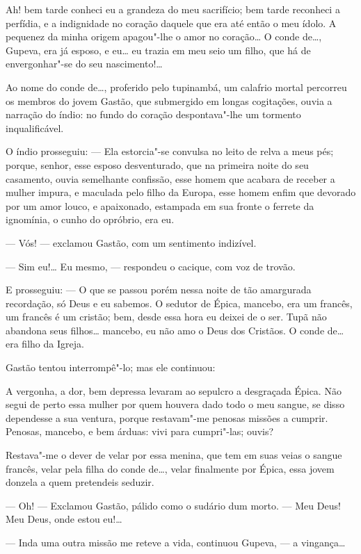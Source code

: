 Ah! bem tarde conheci eu a grandeza do meu sacrifício; bem tarde
reconheci a perfídia, e a indignidade no coração daquele que era até
então o meu ídolo. A pequenez da minha origem apagou"-lhe o amor no
coração\ldots{} O conde de\ldots{}, Gupeva, era já esposo, e eu\ldots{} eu trazia em
meu seio um filho, que há de envergonhar"-se do seu nascimento!\ldots{}

Ao nome do conde de\ldots{}, proferido pelo tupinambá, um calafrio mortal
percorreu os membros do jovem Gastão, que submergido em longas
cogitações, ouvia a narração do índio: no fundo do coração
despontava"-lhe um tormento inqualificável.

O índio prosseguiu: --- Ela estorcia"-se convulsa no leito de relva a
meus pés; porque, senhor, esse esposo desventurado, que na primeira
noite do seu casamento, ouvia semelhante confissão, esse homem que
acabara de receber a mulher impura, e maculada pelo filho da Europa,
esse homem enfim que devorado por um amor louco, e apaixonado, estampada
em sua fronte o ferrete da ignomínia, o cunho do opróbrio, era eu.

--- Vós! --- exclamou Gastão, com um sentimento indizível.

--- Sim eu!\ldots{} Eu mesmo, --- respondeu o cacique, com voz de trovão.

E prosseguiu: --- O que se passou porém nessa noite de tão amargurada
recordação, só Deus e eu sabemos. O sedutor de Épica, mancebo, era um
francês, um francês é um cristão; bem, desde essa hora eu deixei de o
ser. Tupã não abandona seus filhos\ldots{} mancebo, eu não amo o Deus dos
Cristãos. O conde de\ldots{} era filho da Igreja.

Gastão tentou interrompê"-lo; mas ele continuou:

A vergonha, a dor, bem depressa levaram ao sepulcro a desgraçada Épica.
Não segui de perto essa mulher por quem houvera dado todo o meu sangue,
se disso dependesse a sua ventura, porque restavam"-me penosas missões a
cumprir. Penosas, mancebo, e bem árduas: vivi para cumpri"-las; ouvis?

Restava"-me o dever de velar por essa menina, que tem em suas veias o
sangue francês, velar pela filha do conde de\ldots{}, velar finalmente por
Épica, essa jovem donzela a quem pretendeis seduzir.

--- Oh! --- Exclamou Gastão, pálido como o sudário dum morto. --- Meu
Deus! Meu Deus, onde estou eu!\ldots{}

--- Inda uma outra missão me reteve a vida, continuou Gupeva, --- a
vingança\ldots{}

